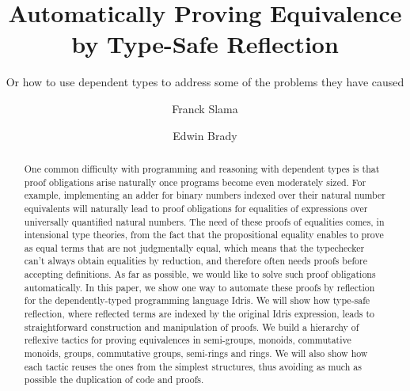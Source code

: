 \documentclass{llncs}
\begin{document}
%
\pagestyle{headings}  %

\mainmatter              %
%
\title{Automatically Proving Equivalence by Type-Safe Reflection}
\subtitle{Or how to use dependent types to address some of the problems they have caused}
%
%
\author{Franck Slama \and Edwin Brady}

\maketitle              %

\begin{abstract}
One common difficulty with programming and reasoning with dependent types is that proof obligations arise naturally once programs become even moderately sized. For example, implementing an adder for binary numbers indexed over their natural number equivalents will naturally lead to proof obligations for equalities of expressions over universally quantified natural numbers. The need of these proofs of equalities comes, in intensional type theories, from the fact that the propositional equality enables to prove as equal terms that are not judgmentally equal, which means that the typechecker can't always obtain equalities by reduction, and therefore often needs proofs before accepting definitions.
As far as possible, we would like to solve such proof obligations automatically. In this paper, we show one way to automate these proofs by reflection for the dependently-typed programming language Idris. We will show how type-safe reflection, where reflected terms are indexed by the original Idris expression, leads to straightforward construction and manipulation of proofs. We build a hierarchy of reflexive tactics for proving equivalences in semi-groups, monoids, commutative monoids, groups, commutative groups, semi-rings and rings. We will also show how each tactic reuses the ones from the simplest structures, thus avoiding as much as possible the duplication of code and proofs.


\end{abstract}
%












\end{document}
